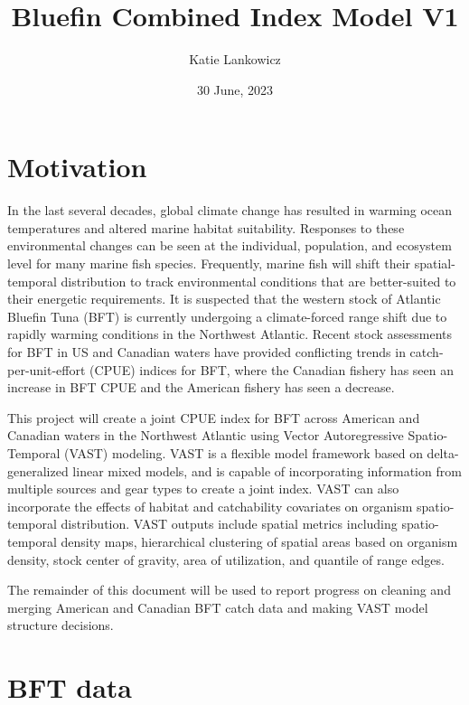 \documentclass[
]{article}
\title{Bluefin Combined Index Model V1}
\author{Katie Lankowicz}
\date{30 June, 2023}
\begin{document}
\maketitle

{
\setcounter{tocdepth}{2}
\tableofcontents
}
\hypertarget{motivation}{%
\section{Motivation}\label{motivation}}

In the last several decades, global climate change has resulted in warming ocean temperatures and altered marine habitat suitability. Responses to these environmental changes can be seen at the individual, population, and ecosystem level for many marine fish species. Frequently, marine fish will shift their spatial-temporal distribution to track environmental conditions that are better-suited to their energetic requirements. It is suspected that the western stock of Atlantic Bluefin Tuna (BFT) is currently undergoing a climate-forced range shift due to rapidly warming conditions in the Northwest Atlantic. Recent stock assessments for BFT in US and Canadian waters have provided conflicting trends in catch-per-unit-effort (CPUE) indices for BFT, where the Canadian fishery has seen an increase in BFT CPUE and the American fishery has seen a decrease.

This project will create a joint CPUE index for BFT across American and Canadian waters in the Northwest Atlantic using Vector Autoregressive Spatio-Temporal (VAST) modeling. VAST is a flexible model framework based on delta-generalized linear mixed models, and is capable of incorporating information from multiple sources and gear types to create a joint index. VAST can also incorporate the effects of habitat and catchability covariates on organism spatio-temporal distribution. VAST outputs include spatial metrics including spatio-temporal density maps, hierarchical clustering of spatial areas based on organism density, stock center of gravity, area of utilization, and quantile of range edges.

The remainder of this document will be used to report progress on cleaning and merging American and Canadian BFT catch data and making VAST model structure decisions.

\hypertarget{bft-data}{%
\section{BFT data}\label{bft-data}}
\end{document}
